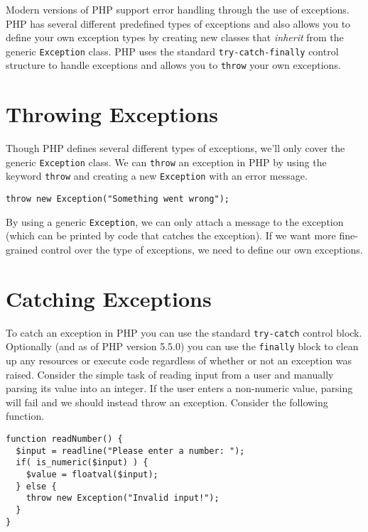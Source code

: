 

Modern versions of PHP support error handling through the 
use of exceptions.  PHP has several different predefined
types of exceptions and also allows you to define your own 
exception types by creating new classes that \emph{inherit} 
from the generic \texttt{Exception} 
class.  PHP uses the standard \texttt{try-catch-finally} 
control structure to handle exceptions and allows you to 
\texttt{throw} your own exceptions.


\section{Throwing Exceptions}

Though PHP defines several different types of exceptions, 
we'll only cover the generic \texttt{Exception} class.
We can \texttt{throw} an exception in PHP by using the
keyword \texttt{throw} and creating a new \texttt{Exception}
with an error message.  

\texttt{throw new Exception("Something went wrong");}

By using a generic \texttt{Exception}, we
can only attach a message to the exception (which can be
printed by code that catches the exception).  If we want
more fine-grained control over the type of exceptions, we
need to define our own exceptions.

\section{Catching Exceptions}

To catch an exception in PHP you can use the standard
\texttt{try-catch} control block.  Optionally (and as
of PHP version 5.5.0) you can use the \texttt{finally} 
block to clean up any resources or execute code regardless of
whether or not an exception was raised.  Consider
the simple task of reading input from a user 
and manually parsing its value into an integer.  If the
user enters a non-numeric value, parsing will fail
and we should instead throw an exception. Consider
the following function.

\begin{verbatim}
function readNumber() {
  $input = readline("Please enter a number: ");
  if( is_numeric($input) ) {
    $value = floatval($input);
  } else {
    throw new Exception("Invalid input!");
  }
}
\end{verbatim}

